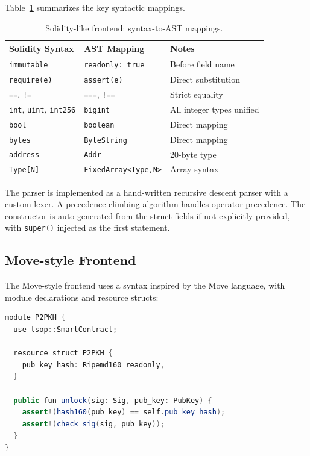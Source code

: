 \documentclass[11pt,a4paper]{article}
\newcommand{\bs}{\texttt{ByteString}}
\newcommand{\bigintty}{\texttt{bigint}}
\newcommand{\boolty}{\texttt{boolean}}
\begin{document}
Table~\ref{tab:sol-mapping} summarizes the key syntactic mappings.

\begin{table}[h]
\centering
\small
\begin{tabular}{@{}lll@{}}
\toprule
\textbf{Solidity Syntax} & \textbf{AST Mapping} & \textbf{Notes} \\
\midrule
\texttt{immutable} & \texttt{readonly: true} & Before field name \\
\texttt{require(e)} & \texttt{assert(e)} & Direct substitution \\
\texttt{==}, \texttt{!=} & \texttt{===}, \texttt{!==} & Strict equality \\
\texttt{int}, \texttt{uint}, \texttt{int256} & \bigintty & All integer types unified \\
\texttt{bool} & \boolty & Direct mapping \\
\texttt{bytes} & \bs & Direct mapping \\
\texttt{address} & \texttt{Addr} & 20-byte type \\
\texttt{Type[N]} & \texttt{FixedArray<Type,N>} & Array syntax \\
\bottomrule
\end{tabular}
\caption{Solidity-like frontend: syntax-to-AST mappings.}
\label{tab:sol-mapping}
\end{table}

The parser is implemented as a hand-written recursive descent parser with a
custom lexer. A precedence-climbing algorithm handles operator precedence.
The constructor is auto-generated from the struct fields if not explicitly
provided, with \texttt{super()} injected as the first statement.

\subsection{Move-style Frontend}
\label{sec:frontend-move}

The Move-style frontend uses a syntax inspired by the Move language, with
module declarations and resource structs:

\begin{lstlisting}[style=tsop,language=Java,
  morekeywords={module,use,resource,struct,public,fun,let,mut,assert}]
module P2PKH {
  use tsop::SmartContract;

  resource struct P2PKH {
    pub_key_hash: Ripemd160 readonly,
  }

  public fun unlock(sig: Sig, pub_key: PubKey) {
    assert!(hash160(pub_key) == self.pub_key_hash);
    assert!(check_sig(sig, pub_key));
  }
}
\end{lstlisting}
\end{document}
